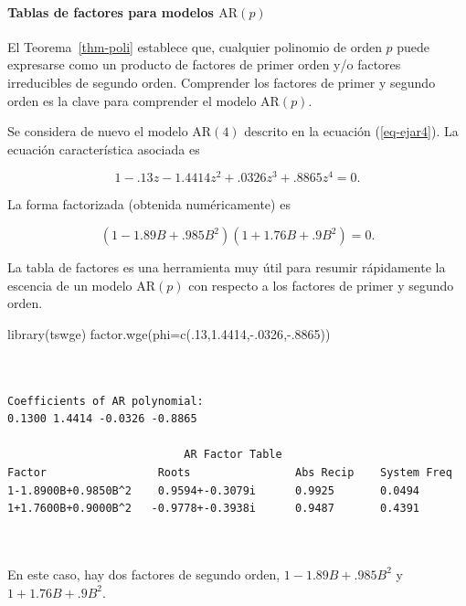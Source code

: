 \documentclass[
  us-letterpaper,
]{scrreprt}
\let\oldparagraph\paragraph
\renewcommand{\paragraph}[1]{\oldparagraph{#1}\mbox{}}
\newenvironment{Shaded}{\begin{snugshade}}{\end{snugshade}}
\newcommand{\AttributeTok}[1]{\textcolor[rgb]{0.40,0.45,0.13}{#1}}
\newcommand{\DecValTok}[1]{\textcolor[rgb]{0.68,0.00,0.00}{#1}}
\newcommand{\FloatTok}[1]{\textcolor[rgb]{0.68,0.00,0.00}{#1}}
\newcommand{\FunctionTok}[1]{\textcolor[rgb]{0.28,0.35,0.67}{#1}}
\newcommand{\NormalTok}[1]{\textcolor[rgb]{0.00,0.23,0.31}{#1}}
\newcommand{\SpecialCharTok}[1]{\textcolor[rgb]{0.37,0.37,0.37}{#1}}
\theoremstyle{plain}
\theoremstyle{definition}
\theoremstyle{definition}
\theoremstyle{plain}
\theoremstyle{remark}
\begin{document}
\paragraph{\texorpdfstring{Tablas de factores para modelos
\(\mathrm{AR}(p)\)}{Tablas de factores para modelos \textbackslash mathrm\{AR\}(p)}}\label{tablas-de-factores-para-modelos-mathrmarp}

El Teorema~\ref{thm-poli} establece que, cualquier polinomio de orden
\(p\) puede expresarse como un producto de factores de primer orden y/o
factores irreducibles de segundo orden. Comprender los factores de
primer y segundo orden es la clave para comprender el modelo
\(\mathrm{AR}(p)\).

\begin{tcolorbox}[enhanced jigsaw, breakable, colbacktitle=quarto-callout-caution-color!10!white, rightrule=.15mm, toptitle=1mm, colback=white, left=2mm, colframe=quarto-callout-caution-color-frame, bottomtitle=1mm, opacitybacktitle=0.6, leftrule=.75mm, arc=.35mm, title={Ejemplo~\ref{exm-ar4} (Continuación\ldots)}, coltitle=black, titlerule=0mm, opacityback=0, bottomrule=.15mm, toprule=.15mm]

Se considera de nuevo el modelo \(\mathrm{AR}(4)\) descrito en la
ecuación (\ref{eq-ejar4}). La ecuación característica asociada es

\[
1-.13z-1.4414z^2+.0326z^3+.8865z^4=0.
\]

La forma factorizada (obtenida numéricamente) es

\[
(1-1.89B+.985B^2)(1+1.76B+.9B^2)=0.
\]

La tabla de factores es una herramienta muy útil para resumir
rápidamente la escencia de un modelo \(\mathrm{AR}(p)\) con respecto a
los factores de primer y segundo orden.

\begin{Shaded}
\begin{Highlighting}[]
\FunctionTok{library}\NormalTok{(tswge)}
\FunctionTok{factor.wge}\NormalTok{(}\AttributeTok{phi=}\FunctionTok{c}\NormalTok{(.}\DecValTok{13}\NormalTok{,}\FloatTok{1.4414}\NormalTok{,}\SpecialCharTok{{-}}\NormalTok{.}\DecValTok{0326}\NormalTok{,}\SpecialCharTok{{-}}\NormalTok{.}\DecValTok{8865}\NormalTok{))}
\end{Highlighting}
\end{Shaded}

\begin{verbatim}
  
  
Coefficients of AR polynomial:  
0.1300 1.4414 -0.0326 -0.8865 

                           AR Factor Table 
Factor                 Roots                Abs Recip    System Freq 
1-1.8900B+0.9850B^2    0.9594+-0.3079i      0.9925       0.0494
1+1.7600B+0.9000B^2   -0.9778+-0.3938i      0.9487       0.4391
  
  
\end{verbatim}

En este caso, hay dos factores de segundo orden, \(1-1.89B+.985B^2\) y
\(1+1.76B+.9B^2\).

\end{tcolorbox}
\end{document}
